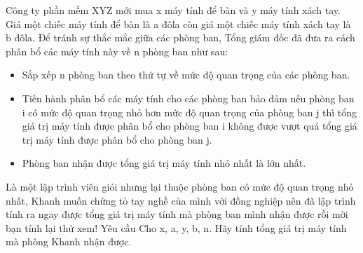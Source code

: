 Công ty phần mềm XYZ mới mua x máy tính để bàn và y máy tính xách tay. Giá một chiếc máy tính để bàn là a đôla còn giá một chiếc máy tính xách tay là b đôla. Để tránh sự thắc mắc giữa các phòng ban, Tổng giám đốc đã đưa ra cách phân bổ các máy tính này về n phòng ban như sau:  
\begin{itemize}
	\item     Sắp xếp n phòng ban theo thứ tự về mức độ quan trọng của các phòng ban.   
	\item     Tiến hành phân bổ các máy tính cho các phòng ban bảo đảm nếu phòng ban i có mức độ quan trọng nhỏ hơn mức độ quan trọng của phòng ban j thì tổng giá trị máy tính được phân bổ cho phòng ban i không được vượt quá tổng giá trị máy tính được phân bổ cho phòng ban j.   
	\item     Phòng ban nhận được tổng giá trị máy tính nhỏ nhất là lớn nhất.   
\end{itemize}

   Là một lập trình viên giỏi nhưng lại thuộc phòng ban có mức độ quan trọng nhỏ nhất, Khanh muốn chứng tỏ tay nghề của mình với đồng nghiệp nên đã lập trình tính ra ngay được tổng giá trị máy tính mà phòng ban mình nhận được rồi mời bạn tính lại thử xem!
Yêu cầu
Cho x, a, y, b, n. Hãy tính tổng giá trị máy tính mà phòng Khanh nhận được.